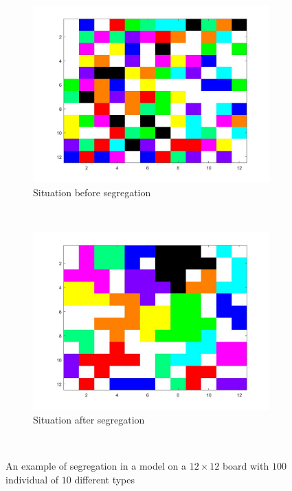 \vspace{-10pt}
\begin{figure}[H]
	\centering
    \begin{subfigure}{0.45\textwidth}
        \includegraphics[width=\textwidth]{vb2beginbord.jpg}
        \caption{Situation before segregation}
        \label{fig:example big board begin}
    \end{subfigure}\hspace{0cm}
    ~ 
    \begin{subfigure}{0.45\textwidth}
        \includegraphics[width=\textwidth]{vb2eindbord.jpg}
        \caption{Situation after segregation}
        \label{fig:example big board end}
    \end{subfigure}
    ~ 
    \caption{An example of segregation in a model on a $12\times 12$ board with $100$ individual of $10$ different types}
    \label{fig:example big board}
\end{figure}
\vspace{-10pt}

